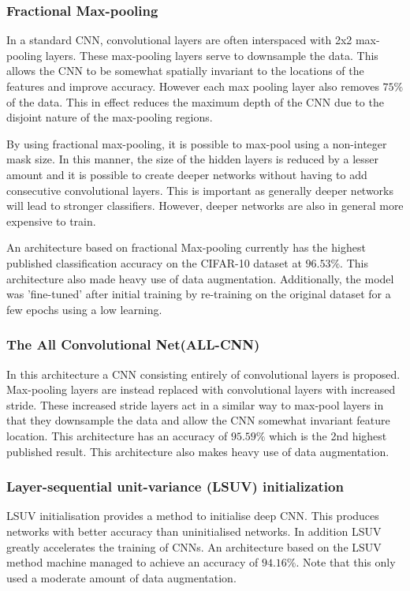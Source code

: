\subsubsection{Fractional Max-pooling}
In a standard CNN, convolutional layers are often interspaced with 2x2 max-pooling layers. These max-pooling layers serve to downsample the data. This allows the CNN to be somewhat spatially invariant to the locations of the features and improve accuracy. However each max pooling layer also removes $75\%$ of the data\cite{graham2014fractional}. This in effect reduces the maximum depth of the CNN due to the disjoint nature of the max-pooling regions.

By using fractional max-pooling, it is possible to max-pool using a non-integer mask size. In this manner, the size of the hidden layers is reduced by a lesser amount and it is possible to create deeper networks without having to add consecutive convolutional layers. This is important as generally deeper networks will lead to stronger classifiers\cite{he2016deep}. However, deeper networks are also in general more expensive to train.

An architecture based on fractional Max-pooling currently has the highest published classification accuracy on the CIFAR-10 dataset at $96.53\%$. This architecture also made heavy use of data augmentation. Additionally, the model was 'fine-tuned' after initial training by re-training on the original dataset for a few epochs using a low learning.

\subsubsection{The All Convolutional Net(ALL-CNN)}

In this architecture\cite{springenberg2014striving} a CNN consisting entirely of convolutional layers is proposed. Max-pooling layers are instead replaced with convolutional layers with increased stride. These increased stride layers act in a similar way to max-pool layers in that they downsample the data and allow the CNN somewhat invariant feature location. This architecture has an accuracy of $95.59\%$ which is the 2nd highest published result. This architecture also makes heavy use of data augmentation.

\subsubsection{Layer-sequential unit-variance (LSUV) initialization}
LSUV initialisation provides a method to initialise deep CNN. This produces networks with better accuracy than uninitialised networks. In addition LSUV greatly accelerates the training of CNNs. An architecture based on the LSUV method machine managed to achieve an accuracy of $94.16\%$. Note that this only used a moderate amount of data augmentation.

